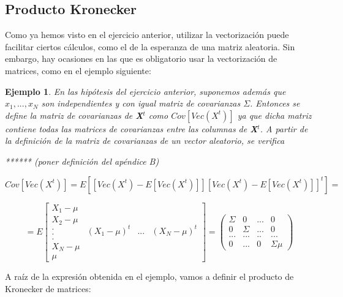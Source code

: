 \documentclass{article}
\theoremstyle{theorem-style}  %
\theoremstyle{definition-style}
\theoremstyle{example-style}
\newtheorem{example}{Ejemplo}[section]
\theoremstyle{exercise-style}
\begin{document}
\subsection{Producto Kronecker}

	Como ya hemos visto en el ejercicio anterior, utilizar la vectorización puede facilitar ciertos cálculos, como el de la esperanza de una matriz aleatoria. Sin embargo, hay ocasiones en las que es obligatorio usar la vectorización de matrices, como en el ejemplo siguiente:
	
	\begin{example}
		En las hipótesis del ejercicio anterior, suponemos además que $x_1, ..., x_N$ son independientes y con igual matriz de covarianzas $\Sigma$. Entonces se define la matriz de covarianzas de \textbf{X}$^t$ como $Cov[Vec(X^t)]$ ya que dicha matriz contiene todas las matrices de covarianzas entre las columnas de \textbf{X}$^t$. A partir de la definición de la matriz de covarianzas de un vector aleatorio, se verifica
		
		****** (poner definición del apéndice B)
		
		$$Cov[Vec(X^t)] = E[[Vec(X^t)  - E[Vec(X^t)]] [Vec(X^t) - E[Vec(X^t)]]^t] = $$
		
		
		$$=E \left[{\begin{array}{c}
			X_1 - \mu\\
			X_2 - \mu\\
			.\\
			.\\
			.\\
			X_N - \mu\\
			\mu
			\end{array}}{\begin{array}{ccc}
			(X_1 - \mu)^t & ... &	(X_N- \mu)^t\\
			\end{array} }\right] =	 \left( {\begin{array}{cccc}
			\Sigma & 0 & ... & 0\\
			0 & \Sigma & ... & 0\\
			... & ... & .. & ... \\
			0 & ... & 0 & \Sigma\mu
			\end{array}}\right) $$
		
	\end{example}
	
	A raíz de la expresión obtenida en el ejemplo, vamos a definir el producto de Kronecker de matrices:
		
\end{document}
